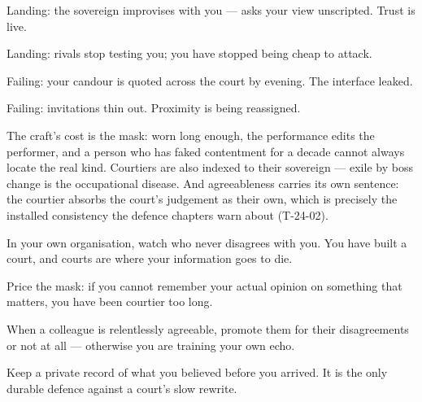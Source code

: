 \begin{feedback}
  \item Landing: the sovereign improvises with you --- asks your view unscripted. Trust is live.
  \item Landing: rivals stop testing you; you have stopped being cheap to attack.
  \item Failing: your candour is quoted across the court by evening. The interface leaked.
  \item Failing: invitations thin out. Proximity is being reassigned.
\end{feedback}
\begin{failure}
The craft's cost is the mask: worn long enough, the performance edits the performer, and a person who has faked contentment for a decade cannot always locate the real kind. Courtiers are also indexed to their sovereign --- exile by boss change is the occupational disease. And agreeableness carries its own sentence: the courtier absorbs the court's judgement as their own, which is precisely the installed consistency the defence chapters warn about (T-24-02).
\end{failure}
\begin{countermeasures}
  \item In your own organisation, watch who never disagrees with you. You have built a court, and courts are where your information goes to die.
  \item Price the mask: if you cannot remember your actual opinion on something that matters, you have been courtier too long.
  \item When a colleague is relentlessly agreeable, promote them for their disagreements or not at all --- otherwise you are training your own echo.
  \item Keep a private record of what you believed before you arrived. It is the only durable defence against a court's slow rewrite.
\end{countermeasures}

\seesources
{}
